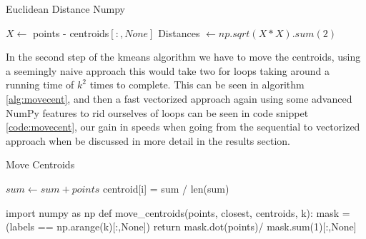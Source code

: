 \documentclass[12pt]{report}
\begin{document}

\begin{algorithm}
  \caption{Euclidean Distance Numpy}
  \label{alg:eucdist}
  \begin{algorithmic}[1]
    \State $X \gets $ points - centroids$[:,None]$
    \State Distances $\gets np.sqrt(X * X).sum(2)$
    \EndProcedure
  \end{algorithmic}
\end{algorithm}

In the second step of the kmeans algorithm we have to move the centroids, using a seemingly naive approach this would take two for loops taking around a running time of $k^2$ times to complete. This can be seen in algorithm \ref{alg:movecent}, and then a fast vectorized approach again using some advanced NumPy features to rid ourselves of loops can be seen in code snippet \ref{code:movecent}, our gain in speeds when going from the sequential to vectorized approach when be discussed in more detail in the results section.


\begin{algorithm}
  \caption{Move Centroids}
  \label{alg:movecent}
  \begin{algorithmic}[1]
    \State $sum \gets sum + points$
    \EndFor
    \State centroid[i] = sum / len(sum)
    \EndFor
    \EndProcedure
  \end{algorithmic}
\end{algorithm}



\begin{python}[caption={Numpy Vectorized version of move centroids}\label{code:movecent}]
import numpy as np
def move_centroids(points, closest, centroids, k):
    mask = (labels == np.arange(k)[:,None])
    return mask.dot(points)/ mask.sum(1)[:,None]
\end{python}
\end{document}
